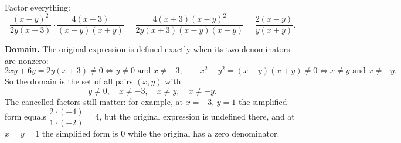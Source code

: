 Factor everything:
\[\dfrac{(x-y)^2}{2y(x+3)}\cdot\dfrac{4(x+3)}{(x-y)(x+y)}=\dfrac{4(x+3)(x-y)^2}{2y(x+3)(x-y)(x+y)}=\boxed{\dfrac{2(x-y)}{y(x+y)}}.\]

\textbf{Domain.} The original expression is defined exactly when its two denominators are nonzero:
\[2xy+6y=2y(x+3)\ne0\iff y\ne0\text{ and }x\ne-3,\qquad x^2-y^2=(x-y)(x+y)\ne0\iff x\ne y\text{ and }x\ne-y.\]
So the domain is the set of all pairs $(x,y)$ with
\[\boxed{y\ne0,\quad x\ne-3,\quad x\ne y,\quad x\ne-y}.\]
The cancelled factors still matter: for example, at $x=-3$, $y=1$ the simplified form equals $\dfrac{2\cdot(-4)}{1\cdot(-2)}=4$, but the original expression is undefined there, and at $x=y=1$ the simplified form is $0$ while the original has a zero denominator.
